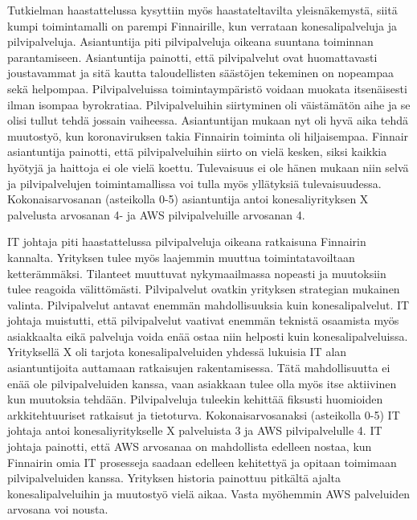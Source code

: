 Tutkielman haastattelussa kysyttiin myös haastateltavilta yleisnäkemystä, siitä kumpi toimintamalli on parempi Finnairille, kun verrataan konesalipalveluja ja pilvipalveluja. Asiantuntija piti pilvipalveluja oikeana suuntana toiminnan parantamiseen. Asiantuntija painotti, että pilvipalvelut ovat huomattavasti joustavammat ja sitä kautta taloudellisten säästöjen tekeminen on nopeampaa sekä helpompaa. Pilvipalveluissa toimintaympäristö voidaan muokata itsenäisesti ilman isompaa byrokratiaa. Pilvipalveluihin siirtyminen oli väistämätön aihe ja se olisi tullut tehdä jossain vaiheessa. Asiantuntijan mukaan nyt oli hyvä aika tehdä muutostyö, kun koronaviruksen takia Finnairin toiminta oli hiljaisempaa. Finnair asiantuntija painotti, että pilvipalveluihin siirto on vielä kesken, siksi kaikkia hyötyjä ja haittoja ei ole vielä koettu. Tulevaisuus ei ole hänen mukaan niin selvä ja pilvipalvelujen toimintamallissa voi tulla myös yllätyksiä tulevaisuudessa. Kokonaisarvosanan (asteikolla 0-5) asiantuntija antoi konesaliyrityksen X palvelusta arvosanan 4- ja AWS pilvipalveluille arvosanan 4.

IT johtaja piti haastattelussa pilvipalveluja oikeana ratkaisuna Finnairin kannalta. Yrityksen tulee myös laajemmin muuttua toimintatavoiltaan ketterämmäksi. Tilanteet muuttuvat nykymaailmassa nopeasti ja muutoksiin tulee reagoida välittömästi. Pilvipalvelut ovatkin yrityksen strategian mukainen valinta. Pilvipalvelut antavat enemmän mahdollisuuksia kuin konesalipalvelut. IT johtaja muistutti, että pilvipalvelut vaativat enemmän teknistä osaamista myös asiakkaalta eikä palveluja voida enää ostaa niin helposti kuin konesalipalveluissa. Yrityksellä X oli tarjota konesalipalveluiden yhdessä lukuisia IT alan asiantuntijoita auttamaan ratkaisujen rakentamisessa. Tätä mahdollisuutta ei enää ole pilvipalveluiden kanssa, vaan asiakkaan tulee olla myös itse aktiivinen kun muutoksia tehdään. Pilvipalveluja tuleekin kehittää fiksusti huomioiden arkkitehtuuriset ratkaisut ja tietoturva. Kokonaisarvosanaksi (asteikolla 0-5) IT johtaja antoi konesaliyritykselle X palveluista 3 ja AWS pilvipalvelulle 4. IT johtaja painotti, että AWS arvosanaa on mahdollista edelleen nostaa, kun Finnairin omia IT prosesseja saadaan edelleen kehitettyä ja opitaan toimimaan pilvipalveluiden kanssa. Yrityksen historia painottuu pitkältä ajalta konesalipalveluihin ja muutostyö vielä aikaa. Vasta myöhemmin AWS palveluiden arvosana voi nousta.  